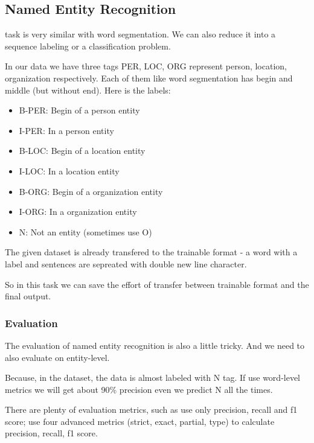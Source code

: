 \subsection{Named Entity Recognition}
\label{sec:ner}

 task is very similar with word segmentation. We can also reduce it into a sequence labeling or a classification problem.

In our data we have three tags PER, LOC, ORG represent person, location, organization respectively. Each of them like word segmentation has begin and middle (but without end). Here is the labels:

\begin{itemize}
    \item B-PER: Begin of a person entity
    \item I-PER: In a person entity
    \item B-LOC: Begin of a location entity
    \item I-LOC: In a location entity
    \item B-ORG: Begin of a organization entity
    \item I-ORG: In a organization entity
    \item N: Not an entity (sometimes use O)
\end{itemize}

The given dataset is already transfered to the trainable format - a word with a label and sentences are sepreated with double new line character.

So in this task we can save the effort of transfer between trainable format and the final output.

\subsubsection*{Evaluation}
\label{sec:ner_eval}

The evaluation of named entity recognition is also a little tricky. And we need to also evaluate on entity-level.

Because, in the dataset, the data is almost labeled with N tag. If use word-level metrics we will get about 90\% precision even we predict N all the times.

There are plenty of evaluation metrics, such as  use only precision, recall and f1 score;  use four advanced metrics (strict, exact, partial, type) to calculate precision, recall, f1 score.

